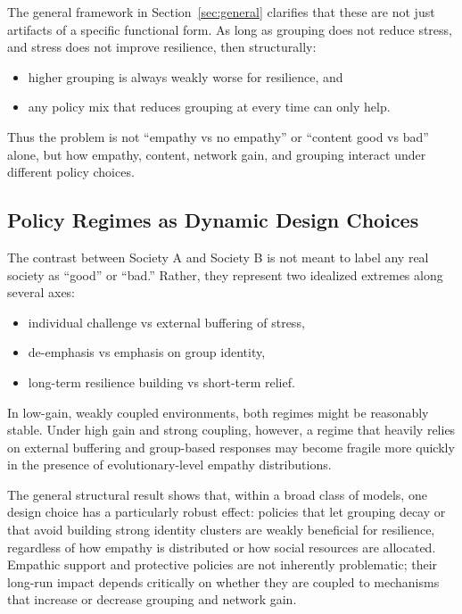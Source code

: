 \documentclass[11pt]{article}
\theoremstyle{plain}
\begin{document}
The general framework in Section~\ref{sec:general} clarifies that these are not just artifacts of a specific functional form.
As long as grouping does not reduce stress, and stress does not improve resilience, then structurally:
\begin{itemize}
  \item higher grouping is always weakly worse for resilience, and
  \item any policy mix that reduces grouping at every time can only help.
\end{itemize}

Thus the problem is not ``empathy vs no empathy'' or ``content good vs bad'' alone, but how empathy, content, network gain, and grouping interact under different policy choices.

\subsection{Policy Regimes as Dynamic Design Choices}

The contrast between Society A and Society B is not meant to label any real society as ``good'' or ``bad.''
Rather, they represent two idealized extremes along several axes:
\begin{itemize}
  \item individual challenge vs external buffering of stress,
  \item de-emphasis vs emphasis on group identity,
  \item long-term resilience building vs short-term relief.
\end{itemize}

In low-gain, weakly coupled environments, both regimes might be reasonably stable.
Under high gain and strong coupling, however, a regime that heavily relies on external buffering and group-based responses may become fragile more quickly in the presence of evolutionary-level empathy distributions.

The general structural result shows that, within a broad class of models, one design choice has a particularly robust effect:
policies that let grouping decay or that avoid building strong identity clusters are weakly beneficial for resilience, regardless of how empathy is distributed or how social resources are allocated.
Empathic support and protective policies are not inherently problematic; their long-run impact depends critically on whether they are coupled to mechanisms that increase or decrease grouping and network gain.
\end{document}
